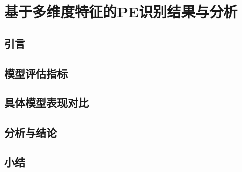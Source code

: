 \chapter{基于多维度特征的PE识别结果与分析}
\section{引言}
\section{模型评估指标}
\section{具体模型表现对比}
\section{分析与结论}
\section{小结}